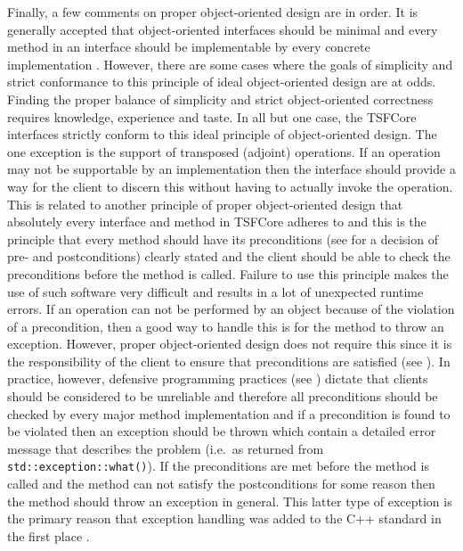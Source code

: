 \documentclass[10pt,fleqn]{article}
\begin{document}
Finally, a few comments on proper object-oriented design are in order.
It is generally accepted that object-oriented interfaces should be
minimal and every method in an interface should be implementable by
every concrete implementation \cite[Section ???]{ref:stroustrup_1997}.
However, there are some cases where the goals of simplicity and strict
conformance to this principle of ideal object-oriented design are at
odds.  Finding the proper balance of simplicity and strict
object-oriented correctness requires knowledge, experience and taste.
In all but one case, the TSFCore interfaces strictly conform to this
ideal principle of object-oriented design.  The one exception is the
support of transposed (adjoint) operations.  If an operation may not
be supportable by an implementation then the interface should provide
a way for the client to discern this without having to actually invoke
the operation.  This is related to another principle of proper
object-oriented design that absolutely every interface and method in
TSFCore adheres to and this is the principle that every method should
have its preconditions (see \cite{ref:uml_distilled_2nd_ed} for a
decision of pre- and postconditions) clearly stated and the client
should be able to check the preconditions before the method is called.
Failure to use this principle makes the use of such software very
difficult and results in a lot of unexpected runtime errors.  If an
operation can not be performed by an object because of the violation
of a precondition, then a good way to handle this is for the method to
throw an exception.  However, proper object-oriented design does not
require this since it is the responsibility of the client to ensure
that preconditions are satisfied (see
\cite{ref:uml_distilled_2nd_ed}).  In practice, however, defensive
programming practices (see \cite{ref:stroustrup_1997}) dictate that clients
should be considered to be unreliable and therefore all preconditions
should be checked by every major method implementation and if a
precondition is found to be violated then an exception should be
thrown which contain a detailed error message that describes the
problem (i.e.~as returned from \texttt{std::exception::what()}).  If
the preconditions are met before the method is called and the method
can not satisfy the postconditions for some reason then the method
should throw an exception in general.  This latter type of exception
is the primary reason that exception handling was added to the C++
standard in the first place \cite{ref:design_evol_cpp}.
\end{document}
